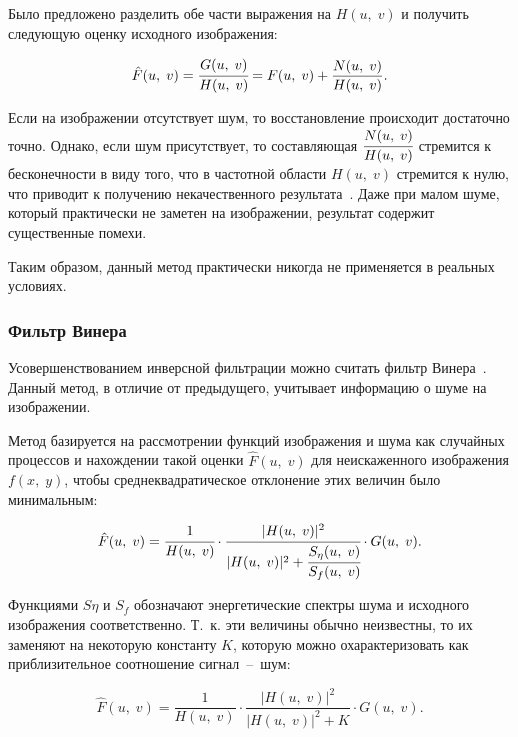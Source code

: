Было предложено разделить обе части выражения на $H(u,\;v)$ и получить следующую оценку исходного изображения:

\begin{equation}\label{inv_div}
	\hat{F}(u,\;v) = \cfrac{G(u,\;v)}{H(u,\;v)} = F(u,\;v) + \frac{N(u,\;v)}{H(u,\;v)}.
\end{equation}

Если на изображении отсутствует шум, то восстановление происходит достаточно точно. Однако, если шум присутствует, то составляющая $\cfrac{N(u,\;v)}{H(u,\;v)}$ стремится к бесконечности в виду того, что в частотной области $H(u,\;v)$ стремится к нулю, что приводит к получению некачественного результата~\cite{inv_noise}. Даже при малом шуме, который практически не заметен на изображении, результат содержит существенные помехи. 

Таким образом, данный метод практически никогда не применяется в реальных условиях.

\subsubsection{Фильтр Винера}

Усовершенствованием инверсной фильтрации можно считать фильтр Винера~\cite{winer}. Данный метод, в отличие от предыдущего, учитывает информацию о шуме на изображении.

Метод базируется на рассмотрении функций изображения и шума как случайных процессов и нахождении такой оценки $\hat{F}(u,\;v)$ для неискаженного изображения $f(x,\;y)$, чтобы среднеквадратическое отклонение этих величин было минимальным:

\begin{equation}
	\hat{F}(u,\;v) = \cfrac{1}{H(u,\;v)}\cdot\cfrac{|H(u,\;v)|^2}{|H(u,\;v)|^2+\cfrac{S_{\eta}(u,\;v)}{S_{f}(u,\;v)}}\cdot G(u,\;v).
\end{equation}

Функциями $S{\eta}$ и $S_f$ обозначают энергетические спектры шума и исходного изображения соответственно. Т.~к. эти величины обычно неизвестны, то их заменяют на некоторую константу $K$, которую можно охарактеризовать как приблизительное соотношение сигнал~--~шум:

\begin{equation}
	\hat{F}(u,\;v) = \frac{1}{H(u,\;v)}\cdot \frac{|H(u,\;v)|^2}{|H(u,\;v)|^2 + K} \cdot G(u,\;v).
\end{equation}

\clearpage 

